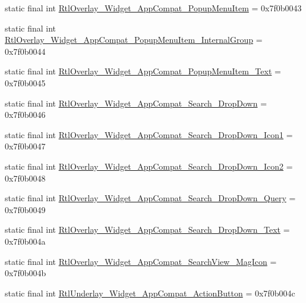 \begin{CompactItemize}
\item 
static final int \hyperlink{classandroid_1_1support_1_1graphics_1_1drawable_1_1animated_1_1_r_1_1style_97fafb8c05399a4d463e9281cc86e2e9}{RtlOverlay\_\-Widget\_\-AppCompat\_\-PopupMenuItem} = 0x7f0b0043
\item 
static final int \hyperlink{classandroid_1_1support_1_1graphics_1_1drawable_1_1animated_1_1_r_1_1style_e6b4f3946dc11f366d4b78c68e809a9b}{RtlOverlay\_\-Widget\_\-AppCompat\_\-PopupMenuItem\_\-InternalGroup} = 0x7f0b0044
\item 
static final int \hyperlink{classandroid_1_1support_1_1graphics_1_1drawable_1_1animated_1_1_r_1_1style_863cc3075d40371e8f632739cf6afd54}{RtlOverlay\_\-Widget\_\-AppCompat\_\-PopupMenuItem\_\-Text} = 0x7f0b0045
\item 
static final int \hyperlink{classandroid_1_1support_1_1graphics_1_1drawable_1_1animated_1_1_r_1_1style_194ec9c5bc141682e7a650d6f07bc333}{RtlOverlay\_\-Widget\_\-AppCompat\_\-Search\_\-DropDown} = 0x7f0b0046
\item 
static final int \hyperlink{classandroid_1_1support_1_1graphics_1_1drawable_1_1animated_1_1_r_1_1style_668135def5b62902676a372f77b49ec1}{RtlOverlay\_\-Widget\_\-AppCompat\_\-Search\_\-DropDown\_\-Icon1} = 0x7f0b0047
\item 
static final int \hyperlink{classandroid_1_1support_1_1graphics_1_1drawable_1_1animated_1_1_r_1_1style_951f22960f5b8a85c4e13eec757ac059}{RtlOverlay\_\-Widget\_\-AppCompat\_\-Search\_\-DropDown\_\-Icon2} = 0x7f0b0048
\item 
static final int \hyperlink{classandroid_1_1support_1_1graphics_1_1drawable_1_1animated_1_1_r_1_1style_dbe457f3d60dc4df58dd4343f302199a}{RtlOverlay\_\-Widget\_\-AppCompat\_\-Search\_\-DropDown\_\-Query} = 0x7f0b0049
\item 
static final int \hyperlink{classandroid_1_1support_1_1graphics_1_1drawable_1_1animated_1_1_r_1_1style_c9e9db2c7947c96380cb8343892ffcb6}{RtlOverlay\_\-Widget\_\-AppCompat\_\-Search\_\-DropDown\_\-Text} = 0x7f0b004a
\item 
static final int \hyperlink{classandroid_1_1support_1_1graphics_1_1drawable_1_1animated_1_1_r_1_1style_b0b6f0acaa681160097ca029a4874690}{RtlOverlay\_\-Widget\_\-AppCompat\_\-SearchView\_\-MagIcon} = 0x7f0b004b
\item 
static final int \hyperlink{classandroid_1_1support_1_1graphics_1_1drawable_1_1animated_1_1_r_1_1style_5e7612f8383b36ba7f6542e2b2e3b2c0}{RtlUnderlay\_\-Widget\_\-AppCompat\_\-ActionButton} = 0x7f0b004c
\item 

\end{CompactItemize}
